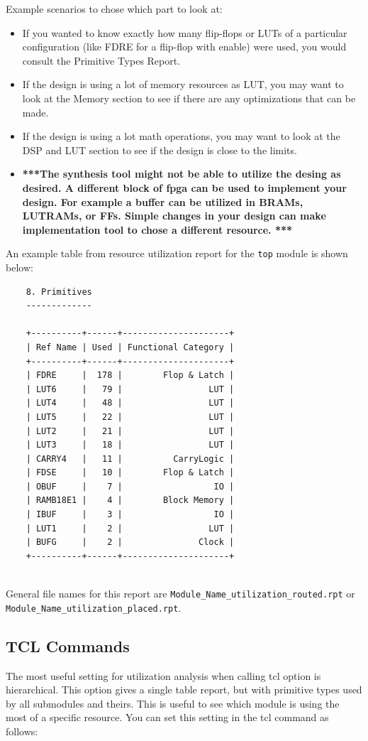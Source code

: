 \documentclass{report}
\begin{document}
Example scenarios to chose which part to look at:
\begin{itemize}
    \item If you wanted to know exactly how many flip-flops or LUTs of a particular configuration (like FDRE for a flip-flop with enable) were used, you would consult the Primitive Types Report.
    \item If the design is using a lot of memory resources as LUT, you may want to look at the Memory section to see if there are any optimizations that can be made.
    \item If the design is using a lot math operations, you may want to look at the DSP and LUT section to see if the design is close to the limits.
    \item \textbf{***The synthesis tool might not be able to utilize the desing as desired. A different block of fpga can be used to implement your design. For example a buffer can be utilized in BRAMs, LUTRAMs, or FFs. Simple changes in your design can make implementation tool to chose a different resource. ***} 
\end{itemize}
An example table from resource utilization report for the \texttt{top} module is shown below:


\begin{verbatim}
    8. Primitives
    -------------
    
    +----------+------+---------------------+
    | Ref Name | Used | Functional Category |
    +----------+------+---------------------+
    | FDRE     |  178 |        Flop & Latch |
    | LUT6     |   79 |                 LUT |
    | LUT4     |   48 |                 LUT |
    | LUT5     |   22 |                 LUT |
    | LUT2     |   21 |                 LUT |
    | LUT3     |   18 |                 LUT |
    | CARRY4   |   11 |          CarryLogic |
    | FDSE     |   10 |        Flop & Latch |
    | OBUF     |    7 |                  IO |
    | RAMB18E1 |    4 |        Block Memory |
    | IBUF     |    3 |                  IO |
    | LUT1     |    2 |                 LUT |
    | BUFG     |    2 |               Clock |
    +----------+------+---------------------+
    
\end{verbatim}

General file names for this report are \texttt{Module\_Name\_utilization\_routed.rpt} or \texttt{Module\_Name\_utilization\_placed.rpt}.

\subsection{TCL Commands}
The most useful setting for utilization analysis when calling tcl option is hierarchical. This option gives a single table report, but with primitive types used by all submodules and theirs. This is useful to see which module is using the most of a specific resource. You can set this setting in the tcl command as follows:
\end{document}
